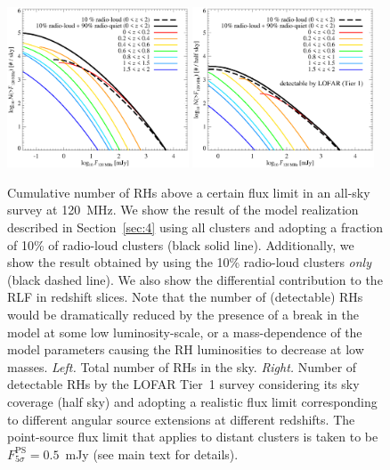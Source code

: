 \documentclass[traditabstract]{aa}
\newcommand{\rmn}{\mathrm}
\begin{document}
\begin{figure}[t]
\centering
\includegraphics[width=0.48\textwidth]{figures/RLF_LOFAR_flux.eps}
\includegraphics[width=0.48\textwidth]{figures/RLF_LOFAR_flux_detectable.eps}
\caption{Cumulative number of RHs above a certain flux limit in an all-sky
  survey at 120~MHz. We show the result of the model realization described in
  Section~\ref{sec:4} using all clusters and adopting a fraction of 10\% of
  radio-loud clusters (black solid line). Additionally, we show the result
  obtained by using the 10\% radio-loud clusters \emph{only} (black dashed
  line). We also show the differential contribution to the RLF in redshift
  slices. Note that the number of (detectable) RHs would be dramatically reduced
  by the presence of a break in the model at some low luminosity-scale, or a
  mass-dependence of the model parameters causing the RH luminosities to
  decrease at low masses.  \emph{Left.} Total number of RHs in the sky.
  \emph{Right.} Number of detectable RHs by the LOFAR Tier~1 survey considering
  its sky coverage (half sky) and adopting a realistic flux limit corresponding
  to different angular source extensions at different redshifts. The
  point-source flux limit that applies to distant clusters is taken to be
  $F_{5\sigma}^{\rmn{PS}}=0.5$~mJy (see main text for details).  }
\label{fig:RLF_120_flux}
\end{figure}
\end{document}
